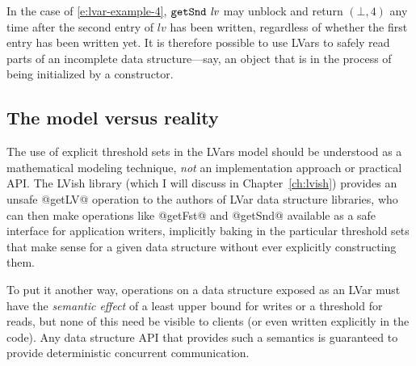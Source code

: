 In the case of \ref{e:lvar-example-4}, $\mbox{\texttt{getSnd}}~\mathit{lv}$ may
unblock and return $(\bot, 4)$ any time after the second entry of
$\mathit{lv}$ has been written, regardless of whether the first entry
has been written yet.  It is therefore possible to use LVars to safely
read parts of an incomplete data structure---say, an object that is in
the process of being initialized by a constructor.

\subsection{The model versus reality}\label{subsection:lvars-the-model-versus-reality}

The use of explicit threshold sets in the LVars model should be
understood as a mathematical modeling technique, \emph{not} an
implementation approach or practical API.  The LVish library (which I
will discuss in Chapter~\ref{ch:lvish}) provides an unsafe @getLV@
operation to the authors of LVar data structure libraries, who can
then make operations like @getFst@ and @getSnd@ available as a safe
interface for application writers, implicitly baking in the particular
threshold sets that make sense for a given data structure without ever
explicitly constructing them.

To put it another way, operations on a data structure exposed as an
LVar must have the \emph{semantic effect} of a least upper bound for
writes or a threshold for reads, but none of this need be visible to
clients (or even written explicitly in the code).  Any data structure
API that provides such a semantics is guaranteed to provide
deterministic concurrent communication.

